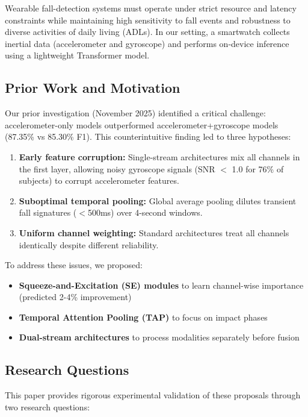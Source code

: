 \documentclass{article}
\begin{document}
Wearable fall-detection systems must operate under strict resource and latency constraints while maintaining high sensitivity to fall events and robustness to diverse activities of daily living (ADLs). In our setting, a smartwatch collects inertial data (accelerometer and gyroscope) and performs on-device inference using a lightweight Transformer model.

\subsection{Prior Work and Motivation}

Our prior investigation (November 2025) identified a critical challenge: accelerometer-only models outperformed accelerometer+gyroscope models (87.35\% vs 85.30\% F1). This counterintuitive finding led to three hypotheses:

\begin{enumerate}[label=\textbf{H\arabic*:}]
    \item \textbf{Early feature corruption:} Single-stream architectures mix all channels in the first layer, allowing noisy gyroscope signals (SNR $<$ 1.0 for 76\% of subjects) to corrupt accelerometer features.
    \item \textbf{Suboptimal temporal pooling:} Global average pooling dilutes transient fall signatures ($<$500ms) over 4-second windows.
    \item \textbf{Uniform channel weighting:} Standard architectures treat all channels identically despite different reliability.
\end{enumerate}

To address these issues, we proposed:
\begin{itemize}
    \item \textbf{Squeeze-and-Excitation (SE) modules} to learn channel-wise importance (predicted 2-4\% improvement)
    \item \textbf{Temporal Attention Pooling (TAP)} to focus on impact phases
    \item \textbf{Dual-stream architectures} to process modalities separately before fusion
\end{itemize}

\subsection{Research Questions}

This paper provides rigorous experimental validation of these proposals through two research questions:
\end{document}
